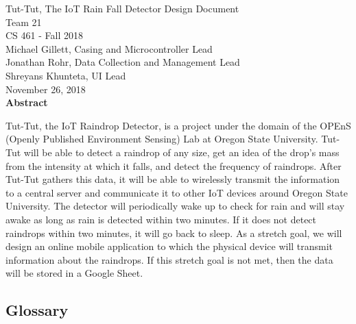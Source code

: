\documentclass[letterpaper,10pt,draftclsnofoot,onecolumn]{article}
\begin{document}
\begin{titlepage}
\vspace*{\fill}
\begin{center}

{\Large Tut-Tut, The IoT Rain Fall Detector Design Document}
\\[0.3cm]

{\large Team 21}
\\[0.3cm]

{\large CS 461 - Fall 2018}
\\[0.3cm]

{\large Michael Gillett, Casing and Microcontroller Lead}
\\[0.3cm]
{\large Jonathan Rohr, Data Collection and Management Lead}
\\[0.3cm]
{\large Shreyans Khunteta, UI Lead}
\\[0.3cm]

{\large November 26, 2018}
\\[1cm]

{\Large \textbf{Abstract}}
\end{center}
Tut-Tut, the IoT Raindrop Detector, is a project under the domain of the OPEnS (Openly Published Environment Sensing) Lab at Oregon State University. Tut-Tut will be able to detect a raindrop of any size, get an idea of the drop's mass from the intensity at which it falls, and detect the frequency of raindrops. After Tut-Tut gathers this data, it will be able to wirelessly transmit the information to a central server and communicate it to other IoT devices around Oregon State University. The detector will periodically wake up to check for rain and will stay awake as long as rain is detected within two minutes. If it does not detect raindrops within two minutes, it will go back to sleep. As a stretch goal, we will design an online mobile application to which the physical device will transmit information about the raindrops. If this stretch goal is not met, then the data will be stored in a Google Sheet.
\vspace*{\fill}

\end{titlepage}

\begin{center}
\section*{Glossary}
\end{center}
\end{document}
